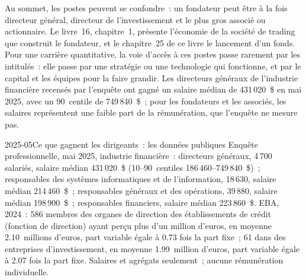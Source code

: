 Au sommet, les postes peuvent se confondre~: un fondateur peut être à la fois directeur général, directeur de l'investissement et le plus gros associé ou
actionnaire. Le livre~16, chapitre~1, présente l'économie de la société de trading que construit le fondateur, et
le chapitre~25 de ce livre le lancement d'un fonds. Pour une carrière quantitative, la voie d'accès à ces postes passe rarement par les intitulés~: elle passe
par une stratégie ou une technologie qui fonctionne, et par le capital et les équipes pour la faire grandir. Les directeurs généraux de l'industrie financière recensés par l'enquête ont gagné un salaire médian de
431\,020~\$ en mai 2025, avec un 90~centile de 749\,840~\$~; pour les fondateurs et les associés, les salaires représentent une faible part de la rémunération,
que l'enquête ne mesure pas.

\begin{dated}{2025-05}{Ce que gagnent les dirigeants~: les données publiques}\label{dat:in:leadership-roles:pay}
Enquête professionnelle, mai 2025, industrie financière~: directeurs généraux, 4\,700 salariés, salaire médian 431\,020~\$ (10--90~centiles
186\,460--749\,840~\$)~; responsables des systèmes informatiques et de l'information, 18\,630, salaire médian 214\,460~\$~; responsables généraux et des opérations, 39\,880,
salaire médian 198\,900~\$~; responsables financiers, salaire médian 223\,860~\$. EBA,  2024~: 586 membres des organes de direction des établissements de crédit (fonction de direction) ayant perçu plus d'un million d'euros,
en moyenne 2.10~millions d'euros, part variable égale à 0.73 fois la part fixe~; 61 dans des entreprises d'investissement, en moyenne 1.99~million d'euros,
part variable égale à 2.07 fois la part fixe. Salaires et agrégats seulement~;
aucune rémunération individuelle.
\end{dated}

